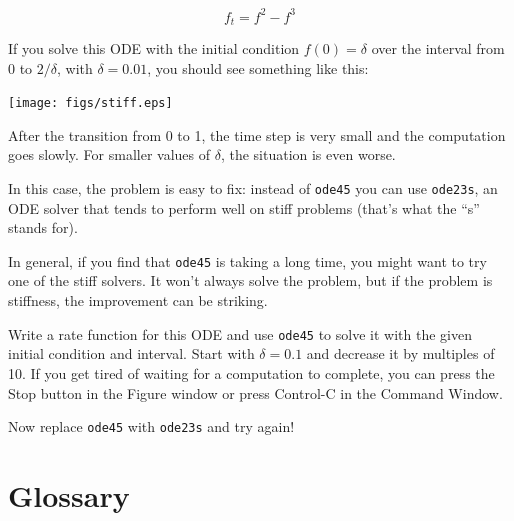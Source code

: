 \documentclass{book}
\begin{document}
\[ f_t = f^2 - f^3 \]

If you solve this ODE with the initial condition $f(0) = \delta$ over
the interval from 0 to $2/\delta$, with $\delta = 0.01$, you should
see something like this:

\beforefig \centerline{\texttt{[image: figs/stiff.eps]}}

After the transition from 0 to 1, the time step is very small and the
computation goes slowly. For smaller values of $\delta$, the
situation is even worse.

In this case, the problem is easy to fix: instead of {\tt ode45} you can
use {\tt ode23s}, an ODE solver that tends to perform well on stiff
problems (that's what the ``s'' stands for).

In general, if you find that {\tt ode45} is taking a long time, you
might want to try one of the stiff solvers. It won't always solve
the problem, but if the problem is stiffness, the improvement can
be striking.

\begin{ex}
Write a rate function for this ODE and use
{\tt ode45} to solve it with the given initial condition and interval.
Start with $\delta = 0.1$ and decrease it by multiples of 10. If
you get tired of waiting for a computation to complete, you can 
press the Stop button in the Figure window or press Control-C in
the Command Window.

Now replace {\tt ode45} with {\tt ode23s} and try again!
\end{ex}



\section{Glossary}
\end{document}
